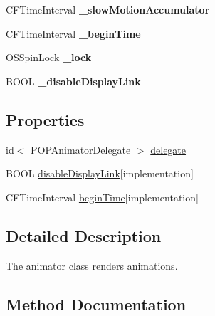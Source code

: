 \begin{DoxyCompactItemize}
C\+F\+Time\+Interval {\bfseries \+\_\+slow\+Motion\+Accumulator}
\item 
\mbox{\label{interface_p_o_p_animator_a397ad816fbac04b936431fd29614bac7}} 
C\+F\+Time\+Interval {\bfseries \+\_\+begin\+Time}
\item 
\mbox{\label{interface_p_o_p_animator_a74d62bb3a63274f8dbe3f34c99127cdb}} 
O\+S\+Spin\+Lock {\bfseries \+\_\+lock}
\item 
\mbox{\label{interface_p_o_p_animator_a1d3b55c7e0236f4335bd6f34b1b745bb}} 
B\+O\+OL {\bfseries \+\_\+disable\+Display\+Link}
\end{DoxyCompactItemize}
\subsection*{Properties}
\begin{DoxyCompactItemize}
\item 
id$<$ P\+O\+P\+Animator\+Delegate $>$ \mbox{\hyperlink{interface_p_o_p_animator_a29a038d778233cb9210268457e890751}{delegate}}
\item 
B\+O\+OL \mbox{\hyperlink{interface_p_o_p_animator_aba292fa27ed32f9b63f102f5b5789c4c}{disable\+Display\+Link}}{\ttfamily  \mbox{[}implementation\mbox{]}}
\item 
C\+F\+Time\+Interval \mbox{\hyperlink{interface_p_o_p_animator_a620436f3a1bc9c76d892752957a32d92}{begin\+Time}}{\ttfamily  \mbox{[}implementation\mbox{]}}
\end{DoxyCompactItemize}


\subsection{Detailed Description}
The animator class renders animations. 

\subsection{Method Documentation}
\mbox{\label{interface_p_o_p_animator_acb57d2ae51f4732276306c0923139edb}} 
